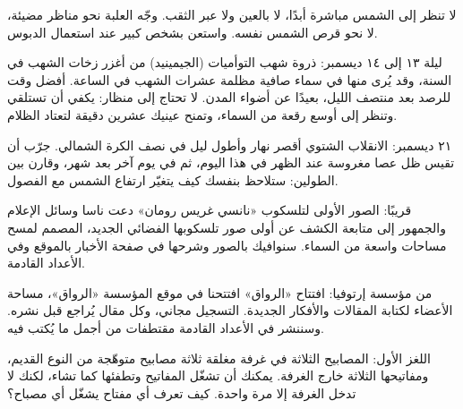\documentclass[11pt]{article}
\begin{document}
\begin{safety}
لا تنظر إلى الشمس مباشرة أبدًا، لا بالعين ولا عبر الثقب. وجّه العلبة نحو مناظر مضيئة، لا نحو قرص الشمس نفسه. واستعن بشخص كبير عند استعمال الدبوس.
\end{safety}
\newpage


\begin{event}{ليلة ١٣ إلى ١٤ ديسمبر: ذروة شهب التوأميات (الجيمينيد)}
من أغزر زخات الشهب في السنة، وقد يُرى منها في سماء صافية مظلمة عشرات الشهب في الساعة. أفضل وقت للرصد بعد منتصف الليل، بعيدًا عن أضواء المدن. لا تحتاج إلى منظار: يكفي أن تستلقي وتنظر إلى أوسع رقعة من السماء، وتمنح عينيك عشرين دقيقة لتعتاد الظلام.
\end{event}

\begin{event}{٢١ ديسمبر: الانقلاب الشتوي}
أقصر نهار وأطول ليل في نصف الكرة الشمالي. جرّب أن تقيس ظل عصا مغروسة عند الظهر في هذا اليوم، ثم في يوم آخر بعد شهر، وقارن بين الطولين: ستلاحظ بنفسك كيف يتغيّر ارتفاع الشمس مع الفصول.
\end{event}

\begin{event}{قريبًا: الصور الأولى لتلسكوب «نانسي غريس رومان»}
دعت ناسا وسائل الإعلام والجمهور إلى متابعة الكشف عن أولى صور تلسكوبها الفضائي الجديد، المصمم لمسح مساحات واسعة من السماء. سنوافيك بالصور وشرحها في صفحة الأخبار بالموقع وفي الأعداد القادمة.
\end{event}

\begin{event}{من مؤسسة إرتوفيا: افتتاح «الرواق»}
افتتحنا في موقع المؤسسة «الرواق»، مساحة الأعضاء لكتابة المقالات والأفكار الجديدة. التسجيل مجاني، وكل مقال يُراجع قبل نشره. وسننشر في الأعداد القادمة مقتطفات من أجمل ما يُكتب فيه.
\end{event}
\newpage


\begin{puzzle}{اللغز الأول: المصابيح الثلاثة}
في غرفة مغلقة ثلاثة مصابيح متوهّجة من النوع القديم، ومفاتيحها الثلاثة خارج الغرفة. يمكنك أن تشغّل المفاتيح وتطفئها كما تشاء، لكنك لا تدخل الغرفة إلا مرة واحدة. كيف تعرف أي مفتاح يشغّل أي مصباح؟
\end{puzzle}
\end{document}
